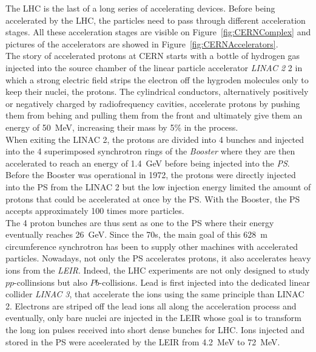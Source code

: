 	The LHC is the last of a long series of accelerating devices. Before being accelerated by the LHC, the particles need to pass through different acceleration stages. All these acceleration stages are visible on Figure~\ref{fig:CERNComplex} and pictures of the accelerators are showed in Figure~\ref{fig:CERNAccelerators}.\\
	
	The story of accelerated protons at CERN starts with a bottle of hydrogen gas injected into the source chamber of the linear particle accelerator \textit{LINAC 2} 2 in which a strong electric field strips the electron off the hygroden molecules only to keep their nuclei, the protons. The cylindrical conductors, alternatively positively or negatively charged by radiofrequency cavities, accelerate protons by pushing them from behing and pulling them from the front and ultimately give them an energy of \SI{50}{MeV}, increasing their mass by 5\% in the process.\\
	
	When exiting the LINAC 2, the protons are divided into 4 bunches and injected into the 4 superimposed synchrotron rings of the \textit{Booster} where they are then accelerated to reach an energy of \SI{1.4}{GeV} before being injected into the \textit{PS}. Before the Booster was operational in 1972, the protons were directly injected into the PS from the LINAC 2 but the low injection energy limited the amount of protons that could be accelerated at once by the PS. With the Booster, the PS accepts approximately 100 times more particles.\\
	
	The 4 proton bunches are thus sent as one to the PS where their energy eventually reaches \SI{26}{GeV}. Since the 70s, the main goal of this \SI{628}{m} circumference synchrotron has been to supply other machines with accelerated particles. Nowadays, not only the PS accelerates protons, it also accelerates heavy ions from the \textit{\acf{LEIR}}. Indeed, the LHC experiments are not only designed to study $pp$-collinsions but also $Pb$-collisions. Lead is first injected into the dedicated linear collider \textit{LINAC 3}, that accelerate the ions using the same principle than LINAC 2. Electrons are striped off the lead ions all along the acceleration process and eventually, only bare nuclei are injected in the LEIR whose goal is to transform the long ion pulses received into short dense bunches for LHC. Ions injected and stored in the PS were aceelerated by the LEIR from \SI{4.2}{MeV} to \SI{72}{MeV}.\\
	
